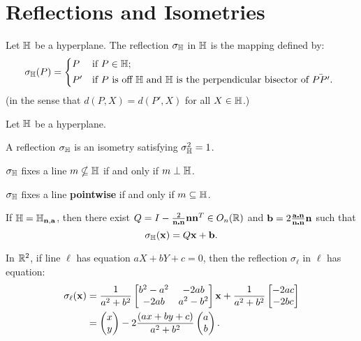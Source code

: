 \section{Reflections and Isometries}

\begin{definition}
    Let \(\mathbb{H}\) be a hyperplane. The reflection \(\sigma_{\mathbb{H}}\) in \(\mathbb{H}\) is the mapping defined by:
    \[\sigma_\bH (P) =
        \begin{cases*}
            P & if \(P \in \bH\); \\
            P' & if \(P\) is off \(\bH\) and \(\bH\) is the perpendicular bisector of \(\bar{PP'}\).
        \end{cases*}
    \]
    (in the sense that \(d(P, X) = d(P', X)\) for all \(X \in \mathbb{H}\).)
\end{definition}

\begin{proposition}
    Let \(\mathbb{H}\) be a hyperplane.
    \begin{statements}{}
        \item A reflection \(\sigma_{\mathbb{H}}\) is an isometry satisfying \(\sigma_{\mathbb{H}}^2 = 1\).
        \item \(\sigma_{\mathbb{H}}\) fixes a line \(m \nsubseteq \mathbb{H}\) if and only if \(m \perp \mathbb{H}\).
        \item \(\sigma_{\mathbb{H}}\) fixes a line \textbf{pointwise} if and only if \(m \subseteq \mathbb{H}\).
    \end{statements}
\end{proposition}

\begin{theorem}
    If \(\mathbb{H} = \mathbb{H}_{\mathbf{n, a}}\), then there exist \(Q = I - \frac{2}{\mathbf{n \centerdot n}}\mathbf{n n}^T \in O_n(\mathbb{R})\) and \(\mathbf{b} = 2 \frac{\mathbf{a \centerdot n}}{\mathbf{n \centerdot n}}\mathbf{n}\) such that
    \[\sigma_{\mathbb{H}} (\mathbf{x}) = Q\mathbf{x} + \mathbf{b}.\]
\end{theorem}

\begin{corollary}
    In \(\mathbb{R}^2\), if line \(\ell\) has equation \(aX + bY + c = 0\), then the reflection \(\sigma_\ell\) in \(\ell\) has equation:
    \begin{align*}
        \sigma_\ell(\mathbf{x}) & = \frac{1}{a^2 + b^2}\begin{bmatrix}
            b^2 - a^2 & -2ab      \\
            -2ab      & a^2 - b^2
        \end{bmatrix} \mathbf{x} + \frac{1}{a^2 + b^2} \begin{bmatrix}
            -2ac \\ -2bc
        \end{bmatrix} \\
                         & = \begin{pmatrix}
            x \\ y
        \end{pmatrix} - 2 \frac{(ax + by + c)}{a^2 + b^2} \begin{pmatrix}
            a \\ b
        \end{pmatrix}.
    \end{align*}
\end{corollary}

